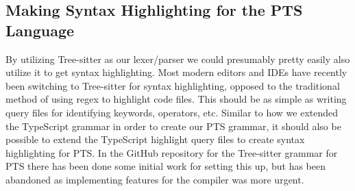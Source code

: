 \subsection{Making Syntax Highlighting for the PTS Language}\label{subsec:making-syntax-highligthing-for-the-pts-language}

By utilizing Tree-sitter as our lexer/parser we could presumably pretty easily also utilize it to get syntax highlighting.
Most modern editors and IDEs have recently been switching to Tree-sitter for syntax highlighting, opposed to the traditional method of using regex to highlight code files.
This should be as simple as writing query files for identifying keywords, operators, etc.
Similar to how we extended the TypeScript grammar in order to create our PTS grammar, it should also be possible to extend the TypeScript highlight query files to create syntax highlighting for PTS\@.
In the GitHub repository for the Tree-sitter grammar for PTS there has been done some initial work for setting this up, but has been abandoned as implementing features for the compiler was more urgent.
